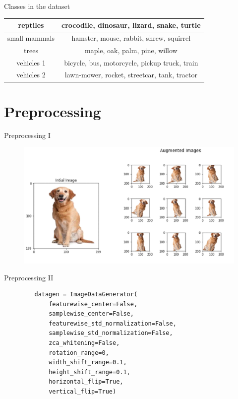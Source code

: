 \documentclass{beamer}
\begin{document}
\begin{frame}[fragile]{Classes in the dataset}
\begin{table}
{\begin{tabular}{|c|c|}
    \hline
    reptiles                       & crocodile, dinosaur, lizard, snake, turtle            \\
    \hline
    small mammals                  & hamster, mouse, rabbit, shrew, squirrel               \\
    \hline
    trees                          & maple, oak, palm, pine, willow                        \\
    \hline
    vehicles 1                     & bicycle, bus, motorcycle, pickup truck, train         \\
    \hline
    vehicles 2                     & lawn-mower, rocket, streetcar, tank, tractor          \\
    \hline
   \end{tabular}
  }
 \end{table}

\end{frame}


\section{Preprocessing}

\begin{frame}[fragile]{Preprocessing I}
 \begin{figure}[H]
  \centering
  \includegraphics[scale=0.45]{img/image_augmentation.png}
 \end{figure}
\end{frame}

\begin{frame}[fragile]{Preprocessing II}
 \begin{figure}[H]
  \centering
  \begin{verbatim}
   datagen = ImageDataGenerator(
       featurewise_center=False,
       samplewise_center=False,
       featurewise_std_normalization=False,
       samplewise_std_normalization=False,
       zca_whitening=False,
       rotation_range=0,
       width_shift_range=0.1,
       height_shift_range=0.1,
       horizontal_flip=True,
       vertical_flip=True)
   \end{verbatim}
 \end{figure}
\end{frame}
\end{document}
